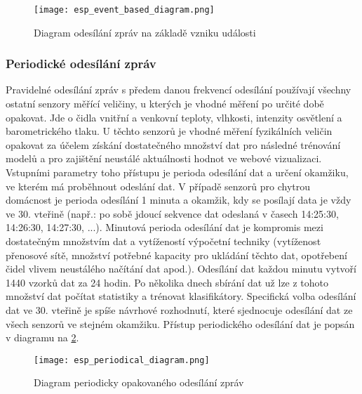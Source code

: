 \begin{figure}[H]
  \centering
  \texttt{[image: esp\_event\_based\_diagram.png]}
  \caption{Diagram odesílání zpráv na základě vzniku události}
  \label{fig:esp_event_based_diagram}
\end{figure} 
 
 \subsubsection*{Periodické odesílání zpráv} \label{subsec:periodical_based_msg}
Pravidelné odesílání zpráv s předem danou frekvencí odesílání používají všechny ostatní senzory měřící veličiny, u kterých je vhodné měření po určité době opakovat. Jde o čidla vnitřní a venkovní teploty, vlhkosti, intenzity osvětlení a barometrického tlaku. U těchto senzorů je vhodné měření fyzikálních veličin opakovat za účelem získání dostatečného množství dat pro následné trénování modelů a pro zajištění neustálé aktuálnosti hodnot ve webové vizualizaci. Vstupními parametry toho přístupu je perioda odesílání dat a určení okamžiku, ve kterém má proběhnout odeslání dat. V případě senzorů pro chytrou domácnost je perioda odesílání 1 minuta a okamžik, kdy se posílají data je vždy ve 30. vteřině (např.: po sobě jdoucí sekvence dat odeslaná v časech 14:25:30, 14:26:30, 14:27:30, ...). Minutová perioda odesílání dat je kompromis mezi dostatečným množstvím dat a vytížeností výpočetní techniky (vytíženost přenosové sítě, množství potřebné kapacity pro ukládání těchto dat, opotřebení čidel vlivem neustálého načítání dat apod.). Odesílání dat každou minutu vytvoří 1440 vzorků dat za 24 hodin. Po několika dnech sbírání dat už lze z tohoto množství dat počítat statistiky a trénovat klasifikátory. Specifická volba odesílání dat ve 30. vteřině je spíše návrhové rozhodnutí, které sjednocuje odesílání dat ze všech senzorů ve stejném okamžiku. Přístup periodického odesílání dat je popsán v diagramu na \cref{fig:esp_periodical_diagram}.

\begin{figure}[H]
  \centering
  \texttt{[image: esp\_periodical\_diagram.png]}
  \caption{Diagram periodicky opakovaného odesílání zpráv}
  \label{fig:esp_periodical_diagram}
\end{figure}

